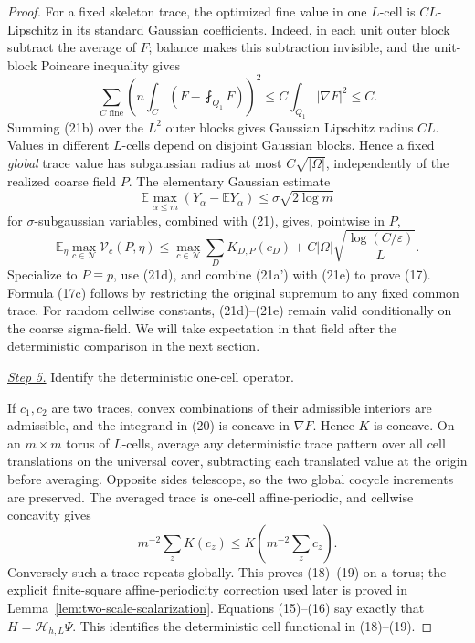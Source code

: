 \documentclass{smfart}
\theoremstyle{definition}
\newcommand{\1}{\mathbf 1}
\begin{document}
\begin{proof}
For a fixed skeleton trace, the optimized fine value in one $L$-cell
is $CL$-Lipschitz in its standard Gaussian coefficients.  Indeed, in
each unit outer block subtract the average of $F$; balance makes this
subtraction invisible, and the unit-block Poincare inequality gives
\begin{equation}
\sum_ {C\text{ fine}}
\left(n\int_ C(F-\fint_ {Q_ 1}F)\right)^2
\leq C\int_ {Q_ 1}|\nabla F|^2\leq C.
\tag{21b}
\end{equation}
Summing (21b) over the $L^2$ outer blocks gives Gaussian Lipschitz
radius $CL$.  Values in different $L$-cells depend on disjoint
Gaussian blocks.  Hence a fixed \emph{global} trace value has subgaussian
radius at most $C\sqrt{|\Omega|}$, independently of the realized
coarse field $P$.  The elementary
Gaussian estimate
\begin{equation*}
\mathbb E\max_ {\alpha\leq m}(Y_ \alpha-\mathbb EY_ \alpha)
\leq \sigma\sqrt{2\log m}
\end{equation*}
for $\sigma$-subgaussian variables, combined with (21), gives,
pointwise in $P$,
\begin{equation}
\mathbb E_ \eta\max_ {c\in\mathcal N}\mathcal V_ c(P,\eta)
\leq\max_ {c\in\mathcal N}\sum_ DK_ {D,P}(c_ D)
+C|\Omega|\sqrt{\frac{\log(C/\varepsilon)}L}.
\tag{21e}
\end{equation}
Specialize to $P\equiv p$, use (21d), and combine (21a') with (21e) to prove
(17).  Formula (17c) follows by restricting the original supremum to
any fixed common trace.  For random cellwise constants, (21d)--(21e) remain valid conditionally
on the coarse sigma-field.  We will take expectation in that field after
the deterministic comparison in the next section.

\smallskip\noindent
\underline{\textit{Step 5.}} Identify the deterministic one-cell operator.

If $c_ 1,c_ 2$ are two traces, convex combinations of their admissible
interiors are admissible, and the integrand in (20) is concave in
$\nabla F$. Hence $K$ is concave. On an $m\times m$ torus of
$L$-cells, average any deterministic trace pattern over all cell
translations on the universal cover, subtracting each translated value
at the origin before averaging.  Opposite sides telescope, so the two
global cocycle increments are preserved.  The averaged trace is
one-cell affine-periodic, and cellwise concavity gives
\begin{equation*}
m^{-2}\sum_ zK(c_ z)\leq K\!\left(m^{-2}\sum_ zc_ z\right).
\end{equation*}
Conversely such a trace repeats globally. This proves (18)--(19) on a
torus; the explicit finite-square affine-periodicity correction used later is
proved in Lemma~\ref{lem:two-scale-scalarization}.  Equations (15)--(16) say
exactly that $H=\mathcal H_ {h,L}\Psi$.  This identifies the deterministic
cell functional in (18)--(19).

\end{proof}
\end{document}
